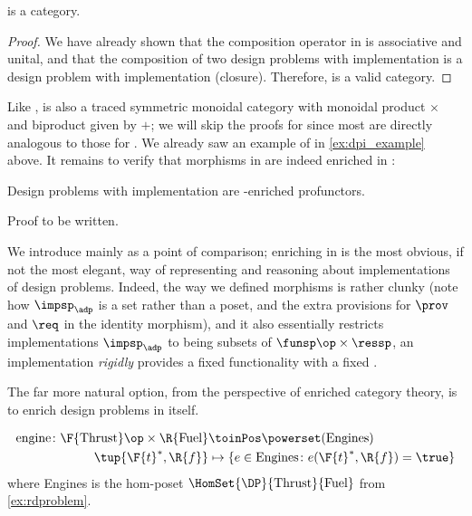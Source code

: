 {    \begin{lemma}
        \DPI is a category.
    \end{lemma}

    \begin{proof}
        We have already shown that the composition operator in \DPI is associative and unital, and that the composition of two design problems with implementation is a design problem with implementation (closure).
        Therefore, \DPI is a valid category.
    \end{proof}

    Like \DP, \DPI is also a traced symmetric monoidal category with monoidal product $\times$ and biproduct given by $+$; we will skip the proofs for \DPI since most are directly analogous to those for \DP.
    We already saw an example of \DPI in \cref{ex:dpi_example} above.
    It remains to verify that morphisms in \DPI are indeed enriched in \Set:

    \begin{proposition}
        Design problems with implementation are \Set-enriched profunctors.
    \end{proposition}
    \begin{publictodo}
        Proof to be written.
    \end{publictodo}
    We introduce \DPI mainly as a point of comparison; enriching in \Set is the most obvious, if not the most elegant, way of representing and reasoning about implementations of design problems.
    Indeed, the way we defined morphisms is rather clunky (note how $\impsp_\adp$ is a set rather than a poset, and the extra provisions for $\prov$ and $\req$ in the identity morphism), and it also essentially restricts implementations $\impsp_\adp$ to being subsets of $\funsp\op \times \ressp$, \ie  an implementation \emph{rigidly} provides a fixed functionality \fun with a fixed \res.

    The far more natural option, from the perspective of enriched category theory, is to enrich design problems in \DP itself.

    \begin{example}
        \begin{equation}
            \begin{aligned}
                \text{engine} \colon \F{\text{Thrust}}\op \times \R{\text{Fuel}} & \toinPos \powerset(\text{Engines})                                  \\
                \tup{\F{t}^*,\R{f}}                                              & \mapsto \{ e \in \text{Engines} \colon e(\F{t}^*, \R{f}) = \true \} 
            \end{aligned}
        \end{equation}
        where Engines is the hom-poset $\HomSet{\DP}{\text{Thrust}}{\text{Fuel}}$ from \cref{ex:rdproblem}.
    \end{example}

}
